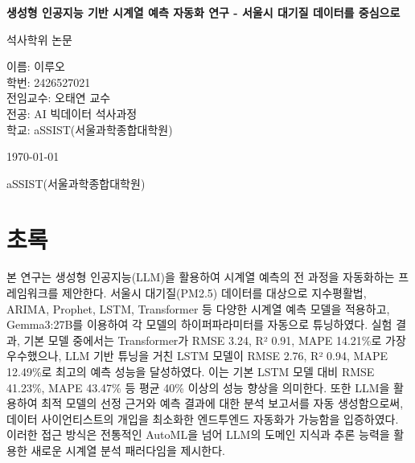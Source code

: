 \documentclass[12pt,ko,a4,]{report}
\begin{document}
\begin{titlepage}
\begin{center}
\vspace*{2cm}

\Huge\textbf{생성형 인공지능 기반 시계열 예측 자동화 연구 - 서울시 대기질 데이터를 중심으로}\\

\vspace{1.5cm}

\LARGE 석사학위 논문\\

\vspace{2cm}

\large 이름: 이루오\\
\large 학번: 2426527021\\
\large 전임교수: 오태연 교수\\
\large 전공: AI 빅데이터 석사과정\\
\large 학교: aSSIST(서울과학종합대학원)\\
\vspace{3cm}

\large\today\\

\vspace{2cm}

\large aSSIST(서울과학종합대학원)\\
\end{center}
\end{titlepage}

\chapter*{초록}

본 연구는 생성형 인공지능(LLM)을 활용하여 시계열 예측의 전 과정을
자동화하는 프레임워크를 제안한다. 서울시 대기질(PM2.5) 데이터를 대상으로
지수평활법, ARIMA, Prophet, LSTM, Transformer 등 다양한 시계열 예측
모델을 적용하고, Gemma3:27B를 이용하여 각 모델의 하이퍼파라미터를
자동으로 튜닝하였다. 실험 결과, 기본 모델 중에서는 Transformer가 RMSE
3.24, R² 0.91, MAPE 14.21\%로 가장 우수했으나, LLM 기반 튜닝을 거친 LSTM
모델이 RMSE 2.76, R² 0.94, MAPE 12.49\%로 최고의 예측 성능을 달성하였다.
이는 기본 LSTM 모델 대비 RMSE 41.23\%, MAPE 43.47\% 등 평균 40\% 이상의
성능 향상을 의미한다. 또한 LLM을 활용하여 최적 모델의 선정 근거와 예측
결과에 대한 분석 보고서를 자동 생성함으로써, 데이터 사이언티스트의
개입을 최소화한 엔드투엔드 자동화가 가능함을 입증하였다. 이러한 접근
방식은 전통적인 AutoML을 넘어 LLM의 도메인 지식과 추론 능력을 활용한
새로운 시계열 분석 패러다임을 제시한다.
\end{document}
